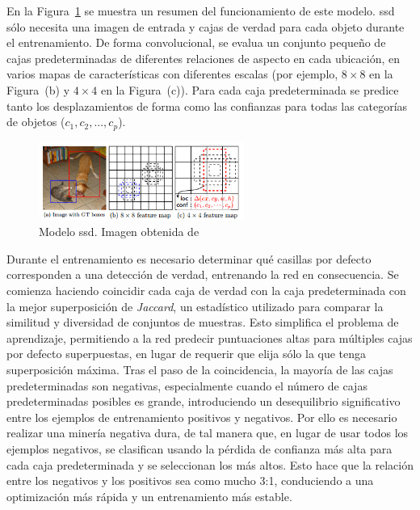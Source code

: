 En la Figura~\ref{fig.ssd} se muestra un resumen del funcionamiento de este modelo. \acrshort{ssd} sólo necesita una imagen de entrada y cajas de verdad para cada objeto durante el entrenamiento. De forma convolucional, se evalua un conjunto pequeño de cajas predeterminadas de diferentes relaciones de aspecto en cada ubicación, en varios mapas de características con diferentes escalas (por ejemplo, $8\times8$ en la Figura~(b) y $4\times4$ en la Figura~(c)). Para cada caja predeterminada se predice tanto los desplazamientos de forma como las confianzas para todas las categorías de objetos ($c_1, c_2, ... , c_p$).

\begin{figure}[H]
	\begin{center}
		\includegraphics[width=0.6\textwidth]{figures/ssd}
		\caption{Modelo \acrshort{ssd}. Imagen obtenida de~\cite{2015arXiv151202325L}}
		\label{fig.ssd}
	\end{center}
\end{figure} 

Durante el entrenamiento es necesario determinar qué casillas por defecto corresponden a una detección de verdad, entrenando la red en consecuencia. Se comienza haciendo coincidir cada caja de verdad con la caja predeterminada con la mejor superposición de \textit{Jaccard}, un estadístico utilizado para comparar la similitud y diversidad de conjuntos de muestras. 
Esto simplifica el problema de aprendizaje, permitiendo a la red predecir puntuaciones altas para múltiples cajas por defecto superpuestas, en lugar de requerir que elija sólo la que tenga superposición máxima. Tras el paso de la coincidencia, la mayoría de las cajas predeterminadas son negativas, especialmente cuando el número de cajas predeterminadas posibles es grande, introduciendo un desequilibrio significativo entre los ejemplos de entrenamiento positivos y negativos. Por ello es necesario realizar una minería negativa dura, de tal manera que, en lugar de usar todos los ejemplos negativos, se clasifican usando la pérdida de confianza más alta para cada caja predeterminada y se seleccionan los más altos. Esto hace que la relación entre los negativos y los positivos sea como mucho 3:1, conduciendo a una optimización más rápida y un entrenamiento más estable. \\

